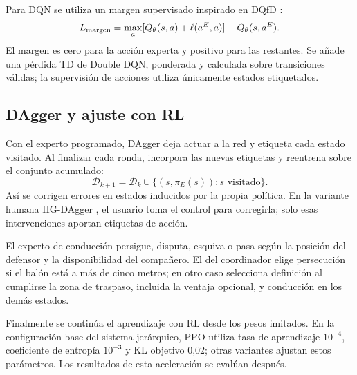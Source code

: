 Para DQN se utiliza un margen supervisado inspirado en DQfD \cite{hester2018}:
\[
    L_{\rm margen}=\max_a[Q_\theta(s,a)+\ell(a^E,a)]-Q_\theta(s,a^E).
\]
El margen es cero para la acción experta y positivo para las restantes. Se añade
una pérdida TD de Double DQN, ponderada y calculada sobre transiciones válidas;
la supervisión de acciones utiliza únicamente estados etiquetados.

\subsection{DAgger y ajuste con RL}
Con el experto programado, DAgger \cite{ross2011} deja actuar a la red y etiqueta
cada estado visitado. Al finalizar cada ronda, incorpora las nuevas etiquetas
y reentrena sobre el conjunto acumulado:
\[
    \mathcal{D}_{k+1}=\mathcal{D}_k\cup\{(s,\pi_E(s)):s\text{ visitado}\}.
\]
Así se corrigen errores en estados inducidos por la propia política. En la variante
humana HG-DAgger \cite{kelly2019}, el usuario toma el control para corregirla;
solo esas intervenciones aportan etiquetas de acción.

El experto de conducción persigue, disputa, esquiva o pasa según la posición
del defensor y la disponibilidad del compañero. El del coordinador elige
persecución si el balón está a más de cinco metros; en otro caso selecciona
definición al cumplirse la zona de traspaso, incluida la ventaja opcional,
y conducción en los demás estados.

Finalmente se continúa el aprendizaje con RL desde los pesos imitados. En la
configuración base del sistema jerárquico, PPO utiliza tasa de aprendizaje
$10^{-4}$, coeficiente de entropía $10^{-3}$ y KL objetivo 0,02; otras variantes
ajustan estos parámetros. Los resultados de esta aceleración se evalúan después.
